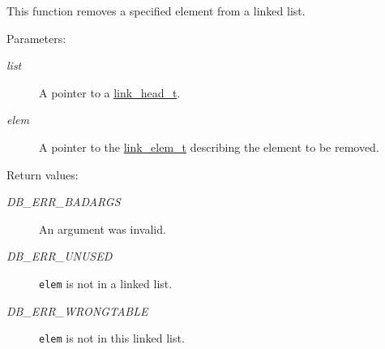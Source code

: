 This function removes a specified element from a linked list.\begin{Desc}
\item[Parameters: ]\par
\begin{description}
\item[{\em 
list}]A pointer to a \hyperlink{group__dbprim__link_a0}{link\_\-head\_\-t}. \item[{\em 
elem}]A pointer to the \hyperlink{group__dbprim__link_a1}{link\_\-elem\_\-t} describing the element to be removed.\end{description}
\end{Desc}
\begin{Desc}
\item[Return values: ]\par
\begin{description}
\item[{\em 
DB\_\-ERR\_\-BADARGS}]An argument was invalid. \item[{\em 
DB\_\-ERR\_\-UNUSED}]{\tt elem} is not in a linked list. \item[{\em 
DB\_\-ERR\_\-WRONGTABLE}]{\tt elem} is not in this linked list. \end{description}
\end{Desc}
